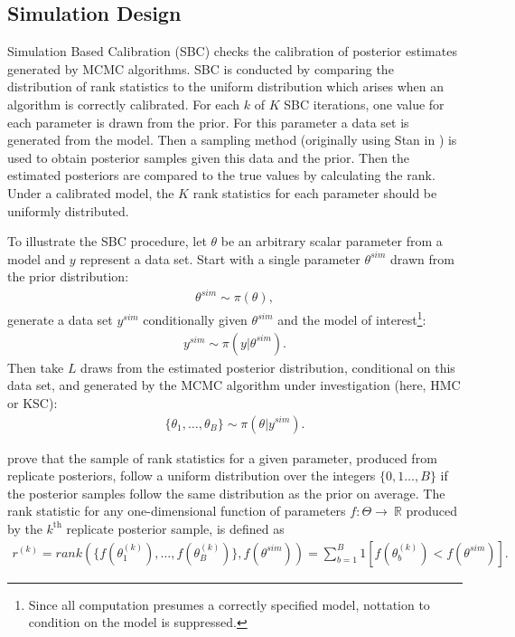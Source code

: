 \documentclass[12pt, a4paper]{article}
\begin{document}
    \subsection{Simulation Design}
        Simulation Based Calibration (SBC) checks the calibration of posterior estimates generated by MCMC algorithms. SBC is conducted by comparing the distribution of rank statistics to the uniform distribution which arises when an algorithm is correctly calibrated. For each $k$ of $K$ SBC iterations, one value for each parameter is drawn from the prior. For this parameter a data set is generated from the model. Then a sampling method (originally using Stan in \citet{talts2020validating}) is used to obtain posterior samples given this data and the prior. Then the estimated posteriors are compared to the true values by calculating the rank. Under a calibrated model, the $K$ rank statistics for each parameter should be uniformly distributed. 

        To illustrate the SBC procedure, let $\theta$ be an arbitrary scalar parameter from a model and $y$ represent a data set. Start with a single parameter $\theta^{sim}$ drawn from the prior distribution:
        \begin{align}
        \theta^{sim} \sim \pi(\theta),
        \end{align}
        generate a data set $y^{sim}$ conditionally given $\theta^{sim}$ and the model of interest\footnote{Since all computation presumes a correctly specified model, nottation to condition on the model is suppressed.}:
        \begin{align}
        y^{sim} \sim \pi (y|\theta^{sim}).
        \end{align}
        Then take $L$ draws from the estimated posterior distribution, conditional on this data set, and generated by the MCMC algorithm under investigation (here, HMC or KSC):
        \begin{align}
        \{\theta_1,\dots , \theta_{B}\} \sim \pi (\theta | y^{sim}).
        \end{align}

        \citet{talts2020validating} prove that the sample of rank statistics for a given parameter, produced from replicate posteriors, follow a uniform distribution over the integers $\{0,1\dots,B\}$ if the posterior samples follow the same distribution as the prior on average. The rank statistic for any one-dimensional function of parameters $f:\Theta\rightarrow\ \mathbb{R}$ produced by the $k^{\mathrm{th}}$ replicate posterior sample, is defined as
        \begin{align}
        r^{(k)} = rank(\{f(\theta_1^{(k)}),\dots , f(\theta_{B}^{(k)})\}, f(\theta^{sim})) = \sum_{b=1}^{B}1[f(\theta_{b}^{(k)}) < f(\theta^{sim})].
        \end{align}
\end{document}
